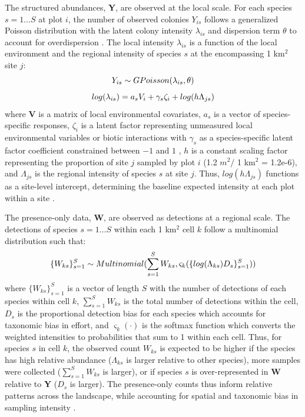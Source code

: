 \documentclass[preprint,final,times,12pt,3p]{elsarticle}
\begin{document}
The structured abundances, \textbf{Y}, are observed at the local scale. For each species $s=1 \dots S$  at plot $i$, the number of observed colonies $Y_{is}$ follows a generalized Poisson distribution with the latent colony intensity $\lambda_{is}$ and dispersion term $\theta$ to account for overdispersion \citep{Consul1992,Ntzoufras2005,Isaac2019,Miller2019}. The local intensity $\lambda_{is}$ is a function of the local environment and the regional intensity of species $s$ at the encompassing 1 km$^2$ site $j$:
    \begin{equation}
        Y_{is} \sim GPoisson(\lambda_{is}, \theta) \\
        \label{eq:Y_GP}
    \end{equation}
    \begin{equation}
        log(\lambda_{is}) = a_s V_i + \gamma_s \zeta_i + log(h\Lambda_{js}) \\
        \label{eq:lambda}
    \end{equation}
where \textbf{V} is a matrix of local environmental covariates, $a_s$ is a vector of species-specific responses, $\zeta_i$ is a latent factor representing unmeasured local environmental variables or biotic interactions with $\gamma_s$ as a species-specific latent factor coefficient constrained between $-1$ and $1$ \citep{Ovaskainen2016,Caradima2019,Tobler2019}, $h$ is a constant scaling factor representing the proportion of site $j$ sampled by plot $i$ (1.2 $m^2 /$ 1 km$^2$ = 1.2e-6), and $\Lambda_{js}$ is the regional intensity of species $s$ at site $j$. Thus, $log(h\Lambda_{js})$ functions as a site-level intercept, determining the baseline expected intensity at each plot within a site \citep{Yamaura2016,Miller2019}.

The presence-only data, \textbf{W}, are observed as detections at a regional scale. The detections of species $s=1 \dots S$ within each 1 km$^2$ cell $k$ follow a multinomial distribution such that:
    \begin{equation}
        \{W_{ks}\}_{s=1}^{S} \sim Multinomial(\sum_{s=1}^{S} W_{ks} , \varsigma_k(\{log(\Lambda_{ks})D_s\}_{s=1}^{S})) \\
        \label{eq:W_Mn}
    \end{equation}
where $\{W_{ks}\}_{s=1}^{S}$ is a vector of length $S$ with the number of detections of each species within cell $k$, $\sum_{s=1}^{S} W_{ks}$ is the total number of detections within the cell, $D_s$ is the proportional detection bias for each species which accounts for taxonomic bias in effort, and $\varsigma_k(\cdot)$ is the softmax function which converts the weighted intensities to probabilities that sum to 1 within each cell. Thus, for species $s$ in cell $k$, the observed count $W_{ks}$ is expected to be higher if the species has high relative abundance ($\Lambda_{ks}$ is larger relative to other species), more samples were collected ($\sum_{s=1}^{S} W_{ks}$ is larger), or if species $s$ is over-represented in \textbf{W} relative to \textbf{Y} ($D_s$ is larger). The presence-only counts thus inform relative patterns across the landscape, while accounting for spatial and taxonomic bias in sampling intensity \citep{Isaac2014}.
\end{document}
